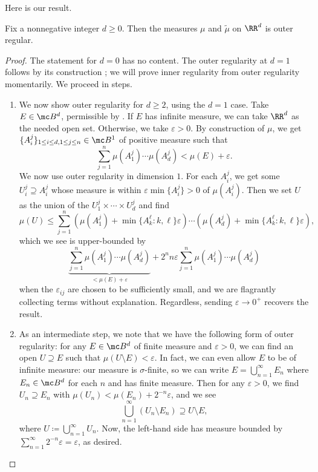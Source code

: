 \documentclass[../notes.tex]{subfiles}
\begin{document}
Here is our result.
\begin{theorem} \label{thm:leb-reg}
	Fix a nonnegative integer $d\ge0$. Then the measures $\mu$ and $\widetilde\mu$ on $\RR^d$ is outer regular.
\end{theorem}
\begin{proof}
	The statement for $d=0$ has no content. The outer regularity at $d=1$ follows by its construction \cite[Lemma~6.15]{elber-top}; we will prove inner regularity from outer regularity momentarily. We proceed in steps.
	\begin{enumerate}
		\item We now show outer regularity for $d\ge2$, using the $d=1$ case. Take $E\in\mc B^d$, permissible by . If $E$ has infinite measure, we can take $\RR^d$ as the needed open set. Otherwise, we take $\varepsilon>0$. By construction of $\mu$, we get $\{A_i^j\}_{1\le i\le d,1\le j\le n}\in\mc B^1$ of positive measure such that
		\[\sum_{j=1}^n\mu(A_1^j)\cdots\mu(A_d^j)<\mu(E)+\varepsilon.\]
		We now use outer regularity in dimension $1$. For each $A_i^j$, we get some $U_i^j\supseteq A_i^j$ whose measure is within $\varepsilon\min\{A_i^j\}>0$ of $\mu(A_i^j)$. Then we set $U$ as the union of the $U_1^j\times\cdots\times U_d^j$ and find
		\[\mu(U)\le\sum_{j=1}^n\left(\mu(A_1^j)+\min\{A_k^\ell:k,\ell\}\varepsilon\right)\cdots\left(\mu(A_d^j)+\min\{A_k^\ell:k,\ell\}\varepsilon\right),\]
		which we see is upper-bounded by
		\[\underbrace{\sum_{j=1}^n\mu(A^j_1)\cdots\mu(A^j_d)}_{<\mu(E)+\varepsilon}{}+2^nn\varepsilon\sum_{j=1}^n\mu(A^j_1)\cdots\mu(A^j_d)\]
		when the $\varepsilon_{ij}$ are chosen to be sufficiently small, and we are flagrantly collecting terms without explanation. Regardless, sending $\varepsilon\to0^+$ recovers the result.

		\item As an intermediate step, we note that we have the following form of outer regularity: for any $E\in\mc B^d$ of finite measure and $\varepsilon>0$, we can find an open $U\supseteq E$ such that $\mu(U\setminus E)<\varepsilon$. In fact, we can even allow $E$ to be of infinite measure: our measure is $\sigma$-finite, so we can write $E=\bigcup_{n=1}^\infty E_n$ where $E_n\in\mc B^d$ for each $n$ and has finite measure. Then for any $\varepsilon>0$, we find $U_n\supseteq E_n$ with $\mu(U_n)<\mu(E_n)+2^{-n}\varepsilon$, and we see
		\[\bigcup_{n=1}^\infty(U_n\setminus E_n)\supseteq U\setminus E,\]
		where $U\coloneqq\bigcup_{n=1}^\infty U_n$. Now, the left-hand side has measure bounded by $\sum_{n=1}^\infty2^{-n}\varepsilon=\varepsilon$, as desired.


\end{enumerate}
\end{proof}
\end{document}
